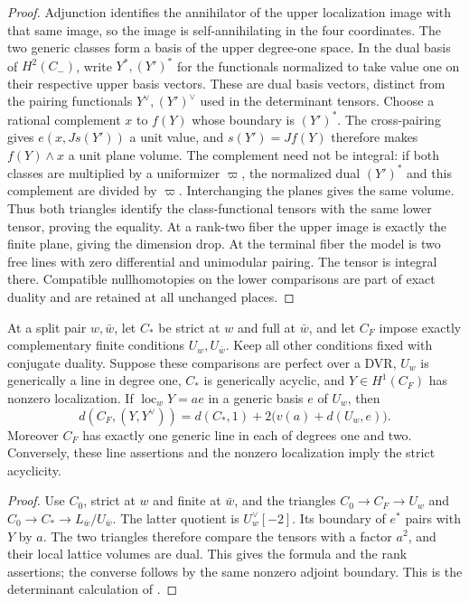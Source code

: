 \begin{proof}
Adjunction identifies the annihilator of the upper localization
image with that same image, so the image is self-annihilating in the
four coordinates.  The two generic classes form a basis of the upper
degree-one space.  In the dual basis of $H^2(C_-)$, write
$Y^*,(Y')^*$ for the functionals normalized to take value one on
their respective upper basis vectors.  These are dual basis
vectors, distinct from the pairing functionals $Y^\vee,(Y')^\vee$
used in the determinant tensors.  Choose a rational complement
$x$ to $f(Y)$ whose boundary is $(Y')^*$.  The cross-pairing gives
$e(x,J s(Y'))$ a unit value, and $s(Y')=Jf(Y)$ therefore makes
$f(Y)\wedge x$ a unit plane volume.  The complement need not be
integral: if both classes are multiplied by a uniformizer
$\varpi$, the normalized dual $(Y')^*$ and this complement
are divided by $\varpi$.
Interchanging the planes gives
the same volume.  Thus both triangles identify the class-functional
tensors with the same lower tensor, proving the equality.  At a
rank-two fiber the upper image is exactly the finite plane, giving
the dimension drop.  At the terminal fiber the model is two free
lines with zero differential and unimodular pairing.  The tensor is
integral there.  Compatible nullhomotopies on the lower comparisons
are part of exact duality and are retained at all unchanged places.
\end{proof}

\begin{lemma}\label{models:strict-finite}
At a split pair $w,\bar w$, let $C_*$ be strict at $w$ and full at
$\bar w$, and let $C_F$ impose exactly complementary finite
conditions $U_w,U_{\bar w}$.  Keep all other conditions fixed with
conjugate duality.  Suppose these comparisons are perfect over a DVR,
$U_w$ is generically a line in degree one, $C_*$ is generically
acyclic, and $Y\in H^1(C_F)$ has nonzero localization.  If
$\operatorname{loc}_wY=a e$ in a generic basis $e$ of $U_w$, then
\begin{equation}\label{models:strict-finite-volume}
 d(C_F,(Y,Y^\vee))=d(C_*,1)+2\bigl(v(a)+d(U_w,e)\bigr).
\end{equation}
Moreover $C_F$ has exactly one generic line in each of degrees one
and two.  Conversely, these line assertions and the nonzero
localization imply the strict acyclicity.
\end{lemma}

\begin{proof}
Use $C_0$, strict at $w$ and finite at $\bar w$, and the triangles
$C_0\to C_F\to U_w$ and $C_0\to C_*\to L_{\bar w}/U_{\bar w}$.
The latter quotient is $U_w^\vee[-2]$.  Its boundary of $e^*$ pairs
with $Y$ by $a$.  The two triangles therefore compare the tensors
with a factor $a^2$, and their local lattice volumes are dual.  This
gives the formula and the rank assertions; the converse follows by
the same nonzero adjoint boundary.  This is the determinant
calculation of \cite[Lemma 3.4]{B}.
\end{proof}


